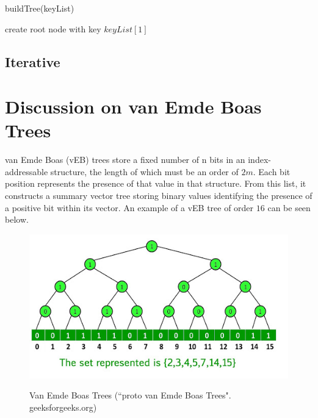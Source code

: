 \documentclass{article}
\begin{document}
        \begin{function}
            \caption{buildTree(keyList)}
            \DontPrintSemicolon


            create root node with key $keyList[1]$\;

        \end{function}

    \subsection*{Iterative}

\pagebreak

\section*{Discussion on van Emde Boas Trees}

van Emde Boas (vEB) trees store a fixed number of n bits in an index-addressable structure, the length of which must be an order of $2m$. Each bit position represents the presence of that value in that structure. From this list, it constructs a summary vector tree storing binary values identifying the presence of a positive bit within its vector. An example of a vEB tree of order $16$ can be seen below.

\begin{figure}[h]
    \centering
    \includegraphics[scale=0.5,keepaspectratio]{Images/vebtree.jpg}
    \label{fig:veb_tree}
    \caption{Van Emde Boas Trees (``proto van Emde Boas Trees". geeksforgeeks.org)}
\end{figure}
\end{document}
